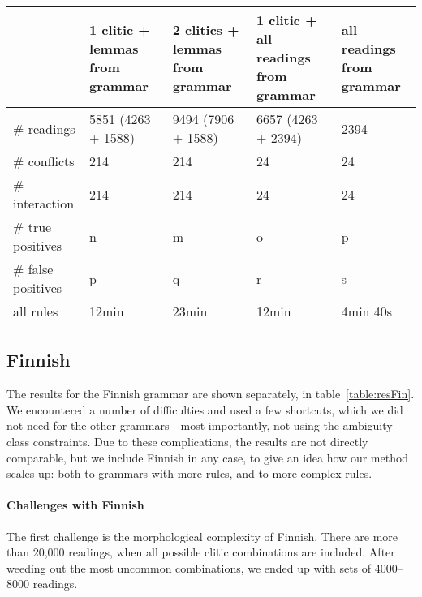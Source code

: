 \begin{table*}[t!]
\centering
\begin{tabular}{|p{2.5cm}|p{3cm}|p{3cm}|p{3cm}|p{3cm}|}

\hline
              & 1 clitic + lemmas from grammar & 2 clitics + lemmas from grammar & 1 clitic + all readings 
                                                from grammar & all readings from grammar \\ \hline
\# readings   & 5851 (4263 
                 + 1588) & 9494
                       (7906 + 1588) & 6657 (4263 + 2394) & 2394  \\ \hline
\# conflicts  & 214      & 214       & 24                & 24  \\ \hline
\# interaction & 214      & 214       & 24                & 24  \\ \hline

\# true 
   positives  & n        & m         & o                & p  \\ \hline
\# false 
   positives  & p        & q         & r                & s   \\ \hline
\clock{}all 
       rules & 12min     & 23min     & 12min &  4min 40s \\ \hline


\end{tabular}
\caption{Results for Finnish (1185 rules).}
\label{table:resFin}
\end{table*}

\subsection{Finnish} 

The results for the Finnish grammar are shown separately, in table~\ref{table:resFin}. We encountered a number of difficulties and used a few shortcuts, which we did not need for the other grammars---most importantly, not using the ambiguity class constraints. Due to these complications, the results are not directly comparable, but we include Finnish in any case, 
to give an idea how our method scales up: both to grammars with more rules, and to more complex rules.

\paragraph{Challenges with Finnish} The first challenge is the morphological complexity of Finnish.
There are more than 20,000 readings, when all possible clitic combinations are included.
After weeding out the most uncommon combinations, we ended up with sets of 4000--8000 readings.

